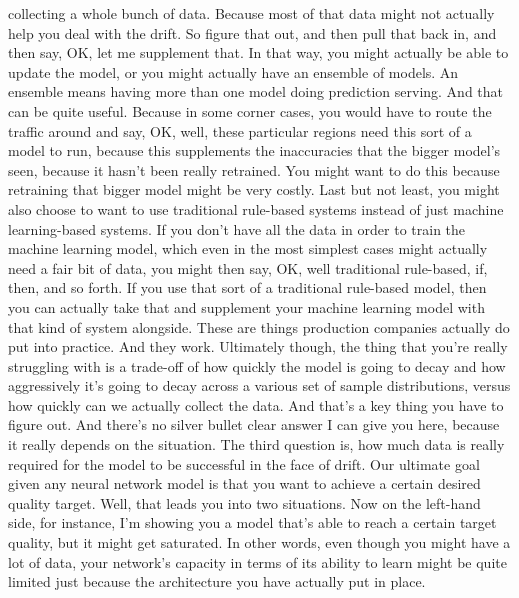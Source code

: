{{{{{{{{     collecting a whole bunch of data.
     Because most of that data might not actually help you deal with the drift.
     So figure that out, and then pull that back in, and then
     say, OK, let me supplement that.
     In that way, you might actually be able to update the model,
     or you might actually have an ensemble of models.
     An ensemble means having more than one model doing prediction serving.
     And that can be quite useful.
     Because in some corner cases, you would have
     to route the traffic around and say, OK, well,
     these particular regions need this sort of a model to run,
     because this supplements the inaccuracies
     that the bigger model's seen, because it hasn't been really retrained.
     You might want to do this because retraining
     that bigger model might be very costly.
     Last but not least, you might also choose
     to want to use traditional rule-based systems instead
     of just machine learning-based systems.
     If you don't have all the data in order to train the machine learning model,
     which even in the most simplest cases might actually need a fair bit of data,
     you might then say, OK, well traditional rule-based, if, then, and so forth.
     If you use that sort of a traditional rule-based model,
     then you can actually take that and supplement your machine learning model
     with that kind of system alongside.
     These are things production companies actually do put into practice.
     And they work.
     Ultimately though, the thing that you're really struggling with
     is a trade-off of how quickly the model is going to decay
     and how aggressively it's going to decay across a various set of sample
     distributions, versus how quickly can we actually collect the data.
     And that's a key thing you have to figure out.
     And there's no silver bullet clear answer
     I can give you here, because it really depends on the situation.
     The third question is, how much data is really required for the model
     to be successful in the face of drift.
     Our ultimate goal given any neural network model
     is that you want to achieve a certain desired quality target.
     Well, that leads you into two situations.
     Now on the left-hand side, for instance, I'm
     showing you a model that's able to reach a certain target quality,
     but it might get saturated.
     In other words, even though you might have a lot of data,
     your network's capacity in terms of its ability to learn
     might be quite limited just because the architecture
     you have actually put in place.
}}}}}}}}
